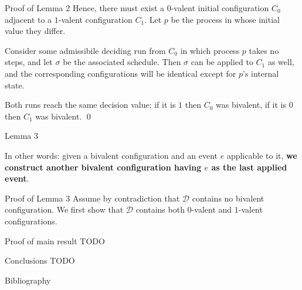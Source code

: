 \documentclass[12pt]{beamer}
\begin{document}
  \begin{frame}{Proof of Lemma 2}
    Hence, there must exist a \(0\)-valent initial configuration \(C_0\)
    adjacent to a \(1\)-valent configuration \(C_1\). Let \(p\) be the process
    in whose initial value they differ.

    \vspace{0.25cm}

    Consider some admissibile deciding run from \(C_0\) in which process \(p\)
    takes no steps, and let \(\sigma\) be the associated schedule. Then
    \(\sigma\) can be applied to \(C_1\) as well, and the corresponding
    configurations will be identical except for \(p\)'s internal state.

    \vspace{0.25cm}

    Both runs reach the same decision value; if it is \(1\) then \(C_0\) was
    bivalent, if it is \(0\) then \(C_1\) was bivalent. \qed
  \end{frame}

  \begin{frame}{Lemma 3}

    \vspace{0.25cm}

    In other words: given a bivalent configuration and an event \(e\)
    applicable to it, \textbf{we construct another bivalent configuration
    having \(e\) as the last applied event}.
  \end{frame}

  \begin{frame}{Proof of Lemma 3}
    Assume by contradiction that \(\mathcal{D}\) contains no bivalent
    configuration. We first show that \(\mathcal{D}\) contains both
    \(0\)-valent and \(1\)-valent configurations.
  \end{frame}

  \begin{frame}{Proof of main result}
    TODO
  \end{frame}

  \begin{frame}{Conclusions}
    TODO
  \end{frame}

  \begin{frame}{Bibliography}
    
  \end{frame}
\end{document}
